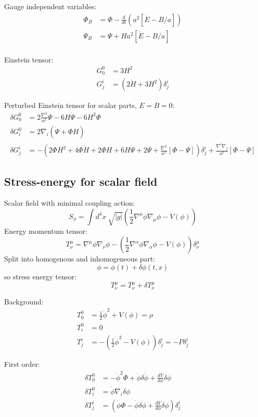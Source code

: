 Gauge independent variables:
\begin{align}
  \Phi_B &=  \Phi - \frac{d}{dt}(a^2[\dot{E}-B/a]) \\
  \Psi_B &=  \Psi + Ha^2[\dot{E}-B/a] \\
\end{align}

Einstein tensor:
\begin{align}
  G^{0}_{0} &= 3 H^2 \\
  G^{i}_{j} &= \left( 2\dot{H} + 3H^2 \right)\delta^{i}_{j}
\end{align}

Perturbed Einstein tensor for scalar parts, $E=B=0$:
\begin{align}
  \delta G^{0}_{0} &= 2\frac{\nabla^2}{a^2} \Psi -6H\dot{\Psi} -6H^2\Phi\\
  \delta G^{0}_{i} &= 2\nabla_i(\dot{\Psi} + \Phi H) \\
  \delta G^{i}_{j} &= -\left( 2 \Phi H^2 +4 \Phi \dot{H} + 2\dot{\Phi}H +6H\dot{\Psi} +2 \ddot{\Psi} + \frac{\nabla^2}{a^2}[\Phi-\Psi] \right)\delta^{i}_{j} + \frac{\nabla^{i}\nabla_{j}}{a^2}[\Phi-\Psi]
\end{align}

\subsection{Stress-energy for scalar field}
Scalar field with minimal coupling action:
\begin{equation}
  S_\phi = \int d^4x\:\sqrt{|g|}\left( \frac{1}{2}\nabla^\mu\phi\nabla_\mu\phi - V(\phi) \right)
\end{equation}
Energy momentum tensor:
\begin{equation}
  T^{\mu}_{\nu} = \nabla^\mu\phi\nabla_\nu\phi - \left( \frac{1}{2}\nabla^\alpha\phi \nabla_\alpha\phi - V(\phi)  \right)\delta^{\mu}_{\nu}
\end{equation}
Split into homogenous and inhomogeneous part:
\begin{equation}
  \phi = \phi(t) + \delta\phi(t,x)
\end{equation}
so stress energy tensor:
\begin{equation}
  T^{\mu}_{\nu} = T^{\mu}_{\nu} + \delta T^{\mu}_{\nu}
\end{equation}

Background:
\begin{align}
  T^{0}_{0} &= \frac{1}{2}\dot{\phi}^2 + V(\phi) = \rho \\
  T^{0}_{i} &= 0 \\
  T^{i}_{j} &= -\left( \frac{1}{2}\dot{\phi}^2 - V(\phi) \right)\delta^{i}_{j} = -P\delta^{i}_{j}
\end{align}

First order:
\begin{align}
  \delta T^{0}_{0} &= -\dot{\phi}^2\Phi + \dot{\phi}\delta\dot{\phi} + \frac{dV}{d\phi} \delta\phi \\
  \delta T^{0}_{i} &= \dot{\phi}\nabla_i\delta\phi\\
  \delta T^{i}_{j} &= \left( \dot{\phi}\Phi-\dot{\phi}\delta\dot{\phi}+\frac{dV}{d\phi} \delta\phi \right)\delta^{i}_{j}
\end{align}

